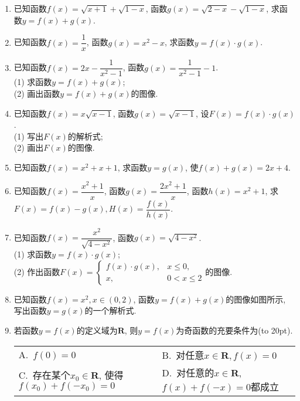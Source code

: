 \documentclass[10pt,a4paper]{article}
\newcommand{\bracket}[1]{(\hbox to #1pt{})}
\newcommand{\twoch}[4]{\par\begin{tabular}{p{.46\textwidth}p{.46\textwidth}}
A.~#1& B.~#2\\
C.~#3& D.~#4
\end{tabular}}
\begin{document}
\begin{enumerate}[1.]
\begin{center}
\end{center}
\item 已知函数$f(x)=\sqrt {x+1}+\sqrt {1-x}$, 函数$g(x)=\sqrt {2-x}-\sqrt {1-x}$, 求函数$y=f(x)+g(x)$.
\item 已知函数$f(x)=\dfrac 1x$, 函数$g(x)=x^2-x$, 求函数$y=f(x)\cdot g(x)$.
\item 已知函数$f(x)=2x-\dfrac 1{x^2-1}$, 函数$g(x)=\dfrac 1{x^2-1}-1$.\\
(1) 求函数$y=f(x)+g(x)$;\\
(2) 画出函数$y=f(x)+g(x)$的图像.
\item 已知函数$f(x)=x\sqrt {x-1}$, 函数$g(x)=\sqrt {x-1}$, 设$F(x)=f(x)\cdot g(x)$.\\
(1) 写出$F(x)$的解析式;\\
(2) 画出$F(x)$的图像.
\item 已知函数$f(x)=x^2+x+1$, 求函数$y=g(x)$, 使$f(x)+g(x)=2x+4$.
\item 已知函数$f(x)=\dfrac{x^2+1}x$, 函数$g(x)=\dfrac{2x^2+1}x$, 函数$h(x)=x^2+1$, 求$F(x)=f(x)-g(x),H(x)=\dfrac{f(x)}{h(x)}$.
\item 已知函数$f(x)=\dfrac{x^2}{\sqrt {4-{x^2}}}$, 函数$g(x)=\sqrt {4-x^2}$.\\
(1) 求函数$y=f(x)\cdot g(x)$;\\
(2) 作出函数$F(x)=\begin{cases} f(x)\cdot g(x), & x\le 0, \\ x, & 0<x\le 2 \end{cases}$的图像.
\item 已知函数$f(x)=x^2,x\in (0,2)$, 函数$y=f(x)+g(x)$的图像如图所示, 写出函数$y=g(x)$的一个解析式.
\begin{center}
\end{center}
\item 若函数$y=f(x)$的定义域为$\mathbf{R}$, 则$y=f(x)$为奇函数的充要条件为\bracket{20}.
\twoch{$f(0)=0$}{对任意$x\in \mathbf{R},f(x)=0$}{存在某个$x_0\in \mathbf{R}$, 使得$f(x_0)+f(-x_0)=0$}{对任意的$x\in \mathbf{R}$, $f(x)+f(-x)=0$都成立}

\end{enumerate}
\end{document}
